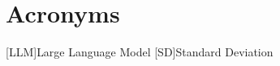 \chapter*{Acronyms}

\begin{acronym}
[LLM]{Large Language Model}
[SD]{Standard Deviation}
\end{acronym}
